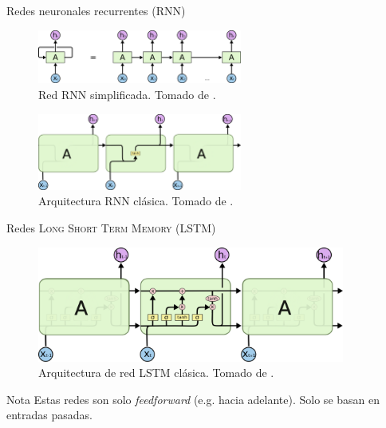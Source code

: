 \documentclass[10pt]{beamer}
\begin{document}
\begin{frame}{Redes neuronales recurrentes (\textsc{RNN})}
  \begin{figure}[H]
    \centering
    \includegraphics[width=0.6\textwidth]{Images/RNN-unrolled.png}
    \caption[Red \textsc{RNN} simplificada]{Red \textsc{RNN} simplificada. Tomado de \cite{understanding-lstm}.}
    \label{fig:rnn-classic-simple}
  \end{figure}

  \begin{figure}[H]
    \centering
    \includegraphics[width=0.6\textwidth]{Images/LSTM3-SimpleRNN.png}
    \caption[Arquitectura \textsc{RNN} clásica]{Arquitectura \textsc{RNN} clásica. Tomado de \cite{understanding-lstm}.}
    \label{fig:rnn-classic}
  \end{figure}
\end{frame}

\begin{frame}{Redes \textsc{Long Short Term Memory (LSTM)}}
  \begin{figure}[H]
    \centering
    \includegraphics[width=0.9\textwidth]{Images/LSTM3-chain.png}
    \caption[Arquitectura de red \textsc{LSTM} clásica]{Arquitectura de red \textsc{LSTM} clásica. Tomado de \cite{understanding-lstm}.}
    \label{fig:lstm-classic}
  \end{figure}

  \begin{alertblock}{Nota}
    Estas redes son solo \emph{feedforward} (e.g. hacia adelante). Solo se basan en entradas pasadas.
  \end{alertblock}
\end{frame}
\end{document}
